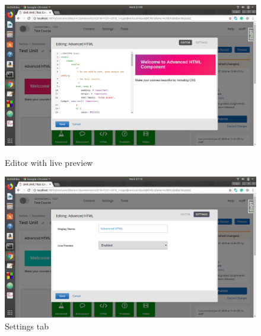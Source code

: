 \begin{figure}[ht]
  \centering
  \includegraphics[width=\textwidth]{images/demo_3}
  \caption{Editor with live preview}

  \vspace*{\floatsep}

  \includegraphics[width=\textwidth]{images/demo_4}
  \caption{Settings tab}
\end{figure}


